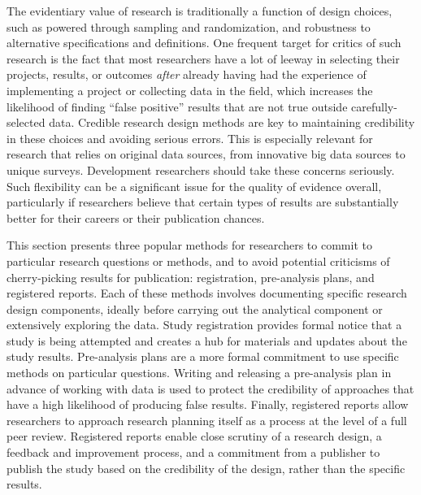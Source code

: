 The evidentiary value of research is traditionally a function of design choices,\cite{angrist2010credibility,ioannidis2005most}
such as powered through sampling and randomization,
and robustness to alternative specifications and definitions.
One frequent target for critics of such research\cite{ioannidis2017power}
is the fact that most researchers have a lot of leeway
in selecting their projects, results, or outcomes
\textit{after} already having had the experience of implementing a project
or collecting data in the field,
which increases the likelihood of finding ``false positive''
results that are not true outside carefully-selected data.\cite{simmons2011false}
Credible research design methods are key to maintaining credibility
in these choices and avoiding serious errors.
This is especially relevant for research that relies on original data sources,
from innovative big data sources to unique surveys.
Development researchers should take these concerns seriously.
Such flexibility can be a significant issue for the quality of evidence overall,
particularly if researchers believe that certain types of results
are substantially better for their careers or their publication chances.

This section presents three popular methods
for researchers to commit to particular research questions or methods,
and to avoid potential criticisms of cherry-picking results for publication:
registration, pre-analysis plans, and registered reports.
Each of these methods involves documenting specific research design components,
ideally before carrying out the analytical component or extensively exploring the data.
Study registration provides formal notice that a study is being attempted 
and creates a hub for materials and updates about the study results.
Pre-analysis plans are a more formal commitment
to use specific methods on particular questions.
Writing and releasing a pre-analysis plan
in advance of working with data is used to protect the credibility
of approaches that have a high likelihood of producing false results.\cite{wicherts2016degrees}
Finally, registered reports allow researchers to approach research planning itself
as a process at the level of a full peer review.
Registered reports enable close scrutiny of a research design,
a feedback and improvement process,
and a commitment from a publisher to publish the study
based on the credibility of the design, rather than the specific results.

